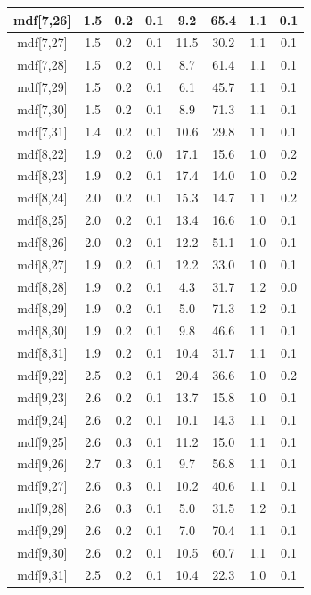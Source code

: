 \begin{longtable}{|c|c|c|c|c|c|c|c|}
mdf[7,26] & 1.5 & 0.2 & 0.1 & 9.2 & 65.4 & 1.1 & 0.1 \\
\hline
mdf[7,27] & 1.5 & 0.2 & 0.1 & 11.5 & 30.2 & 1.1 & 0.1 \\
\hline
mdf[7,28] & 1.5 & 0.2 & 0.1 & 8.7 & 61.4 & 1.1 & 0.1 \\
\hline
mdf[7,29] & 1.5 & 0.2 & 0.1 & 6.1 & 45.7 & 1.1 & 0.1 \\
\hline
mdf[7,30] & 1.5 & 0.2 & 0.1 & 8.9 & 71.3 & 1.1 & 0.1 \\
\hline
mdf[7,31] & 1.4 & 0.2 & 0.1 & 10.6 & 29.8 & 1.1 & 0.1 \\
\hline
mdf[8,22] & 1.9 & 0.2 & 0.0 & 17.1 & 15.6 & 1.0 & 0.2 \\
\hline
mdf[8,23] & 1.9 & 0.2 & 0.1 & 17.4 & 14.0 & 1.0 & 0.2 \\
\hline
mdf[8,24] & 2.0 & 0.2 & 0.1 & 15.3 & 14.7 & 1.1 & 0.2 \\
\hline
mdf[8,25] & 2.0 & 0.2 & 0.1 & 13.4 & 16.6 & 1.0 & 0.1 \\
\hline
mdf[8,26] & 2.0 & 0.2 & 0.1 & 12.2 & 51.1 & 1.0 & 0.1 \\
\hline
mdf[8,27] & 1.9 & 0.2 & 0.1 & 12.2 & 33.0 & 1.0 & 0.1 \\
\hline
mdf[8,28] & 1.9 & 0.2 & 0.1 & 4.3 & 31.7 & 1.2 & 0.0 \\
\hline
mdf[8,29] & 1.9 & 0.2 & 0.1 & 5.0 & 71.3 & 1.2 & 0.1 \\
\hline
mdf[8,30] & 1.9 & 0.2 & 0.1 & 9.8 & 46.6 & 1.1 & 0.1 \\
\hline
mdf[8,31] & 1.9 & 0.2 & 0.1 & 10.4 & 31.7 & 1.1 & 0.1 \\
\hline
mdf[9,22] & 2.5 & 0.2 & 0.1 & 20.4 & 36.6 & 1.0 & 0.2 \\
\hline
mdf[9,23] & 2.6 & 0.2 & 0.1 & 13.7 & 15.8 & 1.0 & 0.1 \\
\hline
mdf[9,24] & 2.6 & 0.2 & 0.1 & 10.1 & 14.3 & 1.1 & 0.1 \\
\hline
mdf[9,25] & 2.6 & 0.3 & 0.1 & 11.2 & 15.0 & 1.1 & 0.1 \\
\hline
mdf[9,26] & 2.7 & 0.3 & 0.1 & 9.7 & 56.8 & 1.1 & 0.1 \\
\hline
mdf[9,27] & 2.6 & 0.3 & 0.1 & 10.2 & 40.6 & 1.1 & 0.1 \\
\hline
mdf[9,28] & 2.6 & 0.3 & 0.1 & 5.0 & 31.5 & 1.2 & 0.1 \\
\hline
mdf[9,29] & 2.6 & 0.2 & 0.1 & 7.0 & 70.4 & 1.1 & 0.1 \\
\hline
mdf[9,30] & 2.6 & 0.2 & 0.1 & 10.5 & 60.7 & 1.1 & 0.1 \\
\hline
mdf[9,31] & 2.5 & 0.2 & 0.1 & 10.4 & 22.3 & 1.0 & 0.1 \\

\end{longtable}
